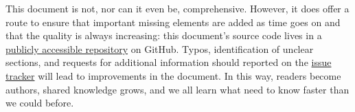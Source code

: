 \documentclass[twocolumn]{article}
\begin{document}
This document is not, nor can it even be, comprehensive.
However, it does offer a route to ensure that important missing elements are added as time goes on and that the quality is always increasing: this document's source code lives in a \href{https://github.com/danielsank/theory}{publicly accessible repository} on GitHub.
Typos, identification of unclear sections, and requests for additional information should reported on the \href{https://github.com/danielsank/theory/issues}{issue tracker} will lead to improvements in the document.
In this way, readers become authors, shared knowledge grows, and we all learn what need to know faster than we could before.





\end{document}
